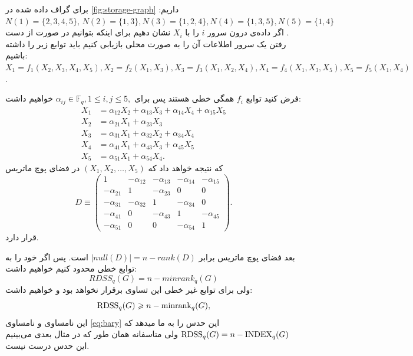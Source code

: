  \begin{example}

 	برای گراف داده شده در
 	\autoref{fig:storage-graph}
 	داریم:
 	$
 		N(1) = \{2,3,4,5\}, \, N(2)  = \{1,3\}, N(3)  = \{1,2,4\}, N(4)  = \{1,3,5\},  N(5)  = \{1,4\}
 	$.
 	اگر داده‌ی درون سرور
 	$i$
 	را با
 	$X_i$
 	نشان دهیم برای اینکه بتوانیم در صورت از دست رفتن یک سرور اطلاعات آن را به صورت محلی بازیابی کنیم باید توابع زیر را داشته باشیم:
 	$X_1 = f_1(X_2,X_3,X_4,X_5), X_2 = f_2(X_1,X_3), X_3 = f_3(X_1,X_2,X_4), X_4 = f_4(X_1,X_3, X_5), X_5 = f_5(X_1, X_4)$.

 	فرض کنید توابع
 	$f_i$
 	همگی خطی هستند پس برای
 	$\alpha_{ij} \in  \mathbb{F}_q, 1\le i,j\le 5,$
 	خواهیم داشت:
 	 	\begin{align*}
 		X_1 &= \alpha_{12} X_2 +\alpha_{13} X_3 + \alpha_{14}X_4 + \alpha_{15}X_5\\
 		X_2 &= \alpha_{21}X_1+\alpha_{23}X_3\\
 		X_3 &= \alpha_{31}X_1 +\alpha_{32}X_2+\alpha_{34}X_4\\
 		X_4 &= \alpha_{41}X_1 + \alpha_{43}X_3 + \alpha_{45}X_5\\
 		X_5 &= \alpha_{51}X_1+\alpha_{54}X_4.
 	\end{align*}
 	که نتیجه خواهد داد که
 	$(X_1,X_2,\dots, X_5)$
 	در فضای پوچ ماتریس
 	\[
 	D \equiv
 	\left( \begin{array}{ccccc}
 		1 & -\alpha_{12} & -\alpha_{13}  & - \alpha_{14} & -\alpha_{15} \\
 		-\alpha_{21} & 1 &  -\alpha_{23} & 0 & 0 \\
 		-\alpha_{31} & -\alpha_{32} & 1 & -\alpha_{34} & 0\\
 		-\alpha_{41} & 0 &-\alpha_{43}  & 1 & -\alpha_{45}\\
 		-\alpha_{51} &0 & 0 & -\alpha_{54} & 1
 	\end{array} \right).\] 
 	قرار دارد.
 	
 	بعد فضای پوچ ماتریس برابر
 	$|null(D)| = n - rank(D)$
 	است. پس اگر خود را به توابع خطی محدود کنیم خواهیم داشت:
 	$$RDSS_q(G) = n - minrank_q(G)$$
 	ولی برای توابع غیر خطی این تساوی برقرار نخواهد بود و خواهیم داشت:
 	\begin{equation}
 		\mathrm{RDSS}_q(G) \geqslant n - \mathrm{minrank}_q(G),
 		\label{eq:minrk}
 	\end{equation}
 	این نامساوی و نامساوی
 	\autoref{eq:bary}
 	این حدس را به ما میدهد که
 	$\mathrm{RDSS}_q(G) = n - \mathrm{INDEX}_q(G)$
 	ولی متاسفانه همان طور که در مثال بعدی می‌بینیم این حدس درست نیست.
 \end{example}
 
